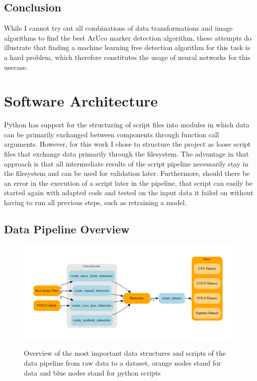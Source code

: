 \documentclass[10pt]{book}
\begin{document}
\subsection{Conclusion}

While I cannot try out all combinations of data transformations and image algorithms to find the best \ac{ArUco} marker detection algorithm, these attempts do illustrate that finding a machine learning free detection algorithm for this task is a hard problem, which therefore constitutes the usage of neural networks for this usecase.

\section{Software Architecture}

Python has support for the structuring of script files into modules in which data can be primarily exchanged between components through function call arguments. However, for this work I chose to structure the project as loose script files that exchange data primarily through the filesystem. The advantage in that approach is that all intermediate results of the script pipeline necessarily stay in the filesystem and can be used for validation later. Furthermore, should there be an error in the execution of a script later in the pipeline, that script can easily be started again with adapted code and tested on the input data it failed on without having to run all previous steps, such as retraining a model.

\subsection{Data Pipeline Overview}

\begin{figure}
  \caption{Overview of the most important data structures and scripts of the data pipeline from raw data to a dataset, orange nodes stand for data and blue nodes stand for python scripts}
  \includegraphics[width=\textwidth]{graph/arch_data}
  \label{fig:arch_data}
\end{figure}
\end{document}
